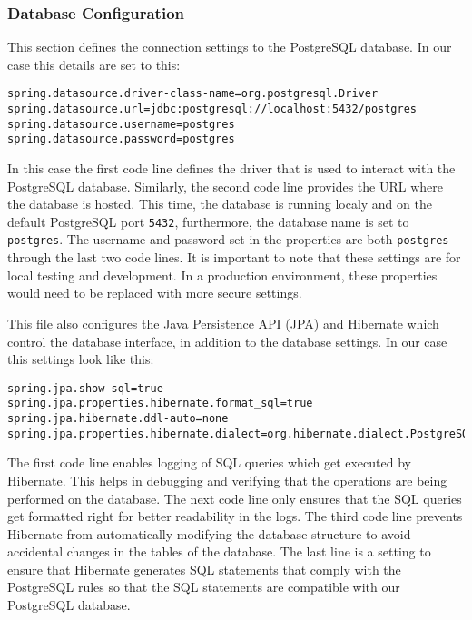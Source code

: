     \subsubsection{Database Configuration}
    This section defines the connection settings to the PostgreSQL database. In our case this details are set to this: 
    \lstset{style=mycsharp, caption=Database Configuration}
        \begin{lstlisting}
spring.datasource.driver-class-name=org.postgresql.Driver
spring.datasource.url=jdbc:postgresql://localhost:5432/postgres
spring.datasource.username=postgres
spring.datasource.password=postgres
        \end{lstlisting}
    In this case the first code line defines the driver that is used to interact with the PostgreSQL database. \newline
    Similarly, the second code line provides the URL where the database is hosted. This time, the database is running localy and on the default PostgreSQL port \texttt{5432}, furthermore, the database name is set to \texttt{postgres}. \newline
    The username and password set in the properties are both \texttt{postgres} through the last two code lines. It is important to note that these settings are for local testing and development. In a production environment, these properties would need to be replaced with more secure settings. \newline

    This file also configures the Java Persistence API (JPA) and Hibernate which control the database interface, in addition to the database settings. In our case this settings look like this:
    \lstset{style=mycsharp, caption=JPA Configuration}
        \begin{lstlisting}
spring.jpa.show-sql=true
spring.jpa.properties.hibernate.format_sql=true
spring.jpa.hibernate.ddl-auto=none
spring.jpa.properties.hibernate.dialect=org.hibernate.dialect.PostgreSQLDialect
        \end{lstlisting}
    The first code line enables logging of SQL queries which get executed by Hibernate. This helps in debugging and verifying that the operations are being performed on the database. \newline
    The next code line only ensures that the SQL queries get formatted right for better readability in the logs. \newline
    The third code line prevents Hibernate from automatically modifying the database structure to avoid accidental changes in the tables of the database. \newline
    The last line is a setting to ensure that Hibernate generates SQL statements that comply with the PostgreSQL rules so that the SQL statements are compatible with our PostgreSQL database.



